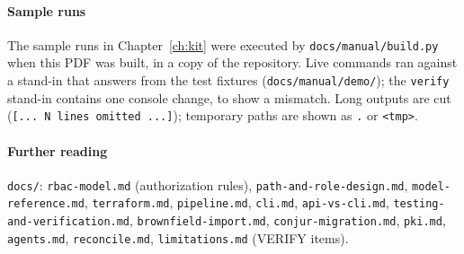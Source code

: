 \paragraph{Sample runs}\label{sec:examples} The sample runs in Chapter~\ref{ch:kit} were executed by
\texttt{docs/manual/build.py} when this PDF was built, in a copy of the repository. Live commands
ran against a stand-in that answers from the test fixtures (\texttt{docs/manual/demo/}); the
\texttt{verify} stand-in contains one console change, to show a mismatch. Long outputs are cut
(\texttt{[... N lines omitted ...]}); temporary paths are shown as \texttt{.} or \texttt{<tmp>}.

\paragraph{Further reading} \texttt{docs/}: \texttt{rbac-model.md} (authorization rules),
\texttt{path-and-role-design.md}, \texttt{model-reference.md}, \texttt{terraform.md}, \texttt{pipeline.md},
\texttt{cli.md}, \texttt{api-vs-cli.md}, \texttt{testing-and-verification.md}, \texttt{brownfield-import.md},
\texttt{conjur-migration.md}, \texttt{pki.md}, \texttt{agents.md}, \texttt{reconcile.md}, \texttt{limitations.md} (VERIFY items).
